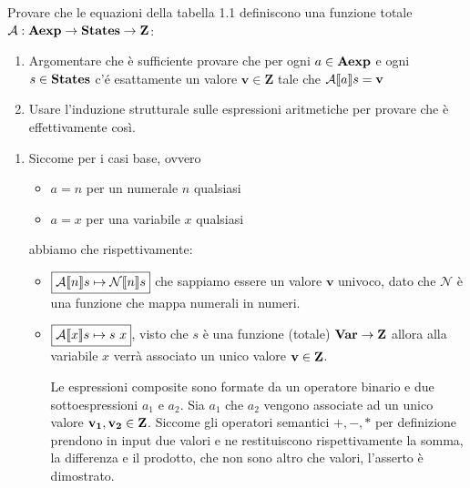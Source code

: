 {Provare che le equazioni della tabella 1.1 definiscono una funzione totale 
$\mathcal{A}:\mbox{\textbf{Aexp}} \rightarrow \mbox{\textbf{States}} \rightarrow \mbox{\textbf{Z}}$: 
	\begin{enumerate}
		\item Argomentare che è sufficiente provare che per ogni 
$a \in \mbox{\textbf{Aexp}}$ e ogni $s \in \mbox{\textbf{States}}$
		c'é esattamente un valore $\mathbf{v} \in \mathbf{Z}$ tale che 
$\mathcal{A} \llbracket a \rrbracket s = \mathbf{v}$
		\item Usare l'induzione strutturale sulle espressioni 
aritmetiche per provare che è effettivamente così.
	\end{enumerate}
}
{
	\begin{enumerate}
		\item Siccome per i casi base, ovvero
		\begin{itemize}
			\item $\boxed{a = n}$ per un numerale $n$ qualsiasi
			\item $\boxed{a = x}$ per una variabile $x$ qualsiasi
		\end{itemize} 
		abbiamo che rispettivamente:
		\begin{itemize}
			\item $\boxed{\mathcal{A} \llbracket n \rrbracket s \mapsto \mathcal{N} \llbracket n \rrbracket s}$ che sappiamo essere un valore $\mathbf{v}$ univoco, dato che $\mathcal{N}$ è una funzione che mappa numerali in numeri.
			\item $\boxed{\mathcal{A} \llbracket x \rrbracket s \mapsto s\mbox{ } x}$, visto che $s$ è una funzione (totale) $\mbox{\textbf{Var}} \rightarrow \mbox{\textbf{Z}}$  allora
			alla variabile $x$ verrà associato un unico valore $\mathbf{v} \in \mbox{\textbf{Z}}$.
			
			Le espressioni composite sono formate da un operatore binario e due sottoespressioni
			$a_1$ e $a_2$.
			Sia $a_1$ che $a_2$ vengono associate ad un unico valore $\mathbf{v_1}, \mathbf{v_2} \in \mbox{\textbf{Z}}$.
			Siccome gli operatori semantici $+, -, *$ per definizione prendono in input due
			valori e ne restituiscono rispettivamente la somma, la differenza e il prodotto, che
			non sono altro che valori, l'asserto è dimostrato.
		

\end{itemize}
\end{enumerate}}
